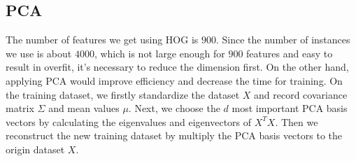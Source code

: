\documentclass{article}
\begin{document}
\subsection{PCA}
The number of features we get using HOG is $900$. Since the number of instances we use is about $4000$, which is not large enough for $900$ features and easy to result in overfit, it's necessary to reduce the dimension first. On the other hand, applying PCA would improve efficiency and decrease the time for training. On the training dataset, we firstly standardize the dataset $X$ and record covariance matrix $\Sigma$ and mean values $\mu$. Next, we choose the $d$ most important PCA basis vectors by calculating the eigenvalues and eigenvectors of $X^TX$. Then we reconstruct the new training dataset by multiply the PCA basis vectors to the origin dataset $X$. %
\end{document}
